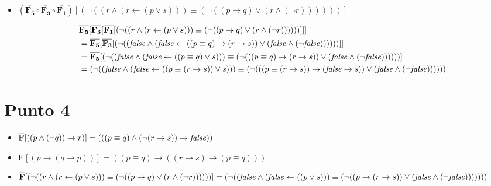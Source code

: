 \documentclass{article}
\newcommand{\val}[2]{\mathbf{#1}[#2]}
\newlength{\logicv}
\newenvironment{logicenv}[2][0]{
  \begin{tcolorbox}[demo, title = #2]
  \vspace*{#1\logicv}
}{
  \end{tcolorbox}
}
\begin{document}
\begin{itemize}
    \item $\val{(\overline{F_5} \circ \overline{F_3} \circ \overline{F_1})}{(\neg ((r \land (r \gets (p \lor s))) \equiv (\neg ((p \to q) \lor (r \land (\neg r))))))}$
    \begin{logicenv}{punto 3}
        \begin{alignat*}{2}
            &\val{\overline{F_5}}{\val{\overline{F_3}}{\val{\overline{F_1}}{(\neg ((r \land (r \gets (p \lor s))) \equiv (\neg ((p \to q) \lor (r \land (\neg r))))))}}}\\
            &= \val{\overline{F_5}}{\val{\overline{F_3}}{(\neg ((\textrm{\textit{false}} \land( \textrm{\textit{false}} \gets ((p \equiv q) \to (r \to s)) \lor (\textrm{\textit{false}} \land (\neg \textrm{\textit{false}}))))))}}\\
            &= \val{\overline{F_5}}{(\neg ((\textrm{\textit{false}} \land (\textrm{\textit{false}} \gets ((p \equiv q) \lor s))) \equiv (\neg (((p \equiv q) \to (r \to s)) \lor (\textrm{\textit{false}} \land (\neg \textrm{\textit{false}}))))))}\\
            &= (\neg ((\textrm{\textit{false}} \land (\textrm{\textit{false}} \gets ((p \equiv (r \to s)) \lor s))) \equiv (\neg (((p \equiv (r \to s)) \to (\textrm{\textit{false}} \to s)) \lor (\textrm{\textit{false}} \land (\neg \textrm{\textit{false}}))))))
        \end{alignat*}
    \end{logicenv}
\end{itemize}

\section{Punto 4}
 \begin{logicenv}[6]{{$\mathbf{\overline{F}} = \{p \mapsto (p \equiv q), q \mapsto (r \to s), r \mapsto \textrm{\textit{false}}\}$}}
    \begin{itemize}
        \item $\val{\overline{F}}{((p \land (\neg q)) \to r)} = (((p \equiv q) \land (\neg (r \to s)) \to \textrm{\textit{false}}))$
        \item $\val{\overline{F}}{(p \to (q \to p))} = ((p \equiv q) \to ((r \to s) \to (p \equiv q)))$
        \item $\val{\overline{F}}{(\neg ((r \land (r \gets (p \lor s))) \equiv (\neg ((p \to q) \lor (r \land (\neg r))))))} = (\neg ((\textrm{\textit{false}} \land (\textrm{\textit{false}} \gets ((p \lor s))) \equiv (\neg ((p \to (r \to s)) \lor (\textrm{\textit{false}} \land (\neg \textrm{\textit{false}})))))))$
    \end{itemize}
\end{logicenv}
\end{document}

